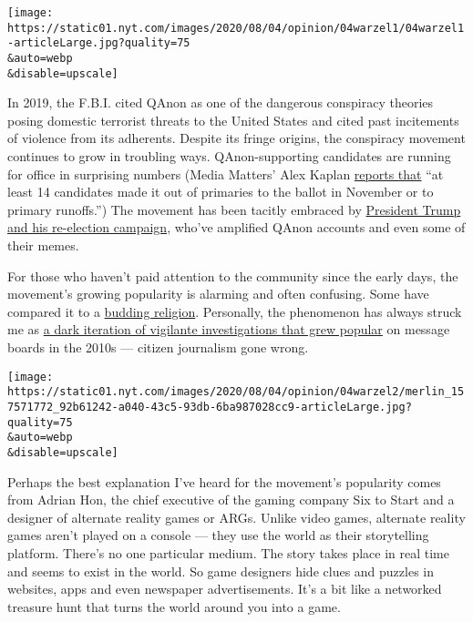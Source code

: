 \texttt{[image: https://static01.nyt.com/images/2020/08/04/opinion/04warzel1/04warzel1-articleLarge.jpg?quality=75\\\&auto=webp\\\&disable=upscale]}

In 2019, the F.B.I. cited QAnon as one of the dangerous conspiracy
theories posing domestic terrorist threats to the United States and
cited past incitements of violence from its adherents. Despite its
fringe origins, the conspiracy movement continues to grow in troubling
ways. QAnon-supporting candidates are running for office in surprising
numbers (Media Matters' Alex Kaplan
\href{https://www.mediamatters.org/qanon-conspiracy-theory/qanon-may-be-coming-congress-and-journalists-need-be-ready}{reports
that} ``at least 14 candidates made it out of primaries to the ballot in
November or to primary runoffs.'') The movement has been tacitly
embraced by
\href{https://www.washingtonpost.com/politics/how-the-trump-campaign-came-to-court-qanon-the-online-conspiracy-movement-identified-by-the-fbi-as-a-violent-threat/2020/08/01/dd0ea9b4-d1d4-11ea-9038-af089b63ac21_story.html?utm_campaign=wp_politics_am\&utm_medium=email\&utm_source=newsletter\&wpisrc=nl_politics}{President
Trump and his re-election campaign}, who've amplified QAnon accounts and
even some of their memes.

For those who haven't paid attention to the community since the early
days, the movement's growing popularity is alarming and often confusing.
Some have compared it to a
\href{https://www.theatlantic.com/magazine/archive/2020/06/qanon-nothing-can-stop-what-is-coming/610567/}{budding
religion}. Personally, the phenomenon has always struck me as
\href{https://www.buzzfeednews.com/article/charliewarzel/behind-the-alarming-rise-of-the-online-vigilante-detective}{a
dark iteration of vigilante investigations that grew popular} on message
boards in the 2010s --- citizen journalism gone wrong.

\texttt{[image: https://static01.nyt.com/images/2020/08/04/opinion/04warzel2/merlin\_157571772\_92b61242-a040-43c5-93db-6ba987028cc9-articleLarge.jpg?quality=75\\\&auto=webp\\\&disable=upscale]}

Perhaps the best explanation I've heard for the movement's popularity
comes from Adrian Hon, the chief executive of the gaming company Six to
Start and a designer of alternate reality games or ARGs. Unlike video
games, alternate reality games aren't played on a console --- they use
the world as their storytelling platform. There's no one particular
medium. The story takes place in real time and seems to exist in the
world. So game designers hide clues and puzzles in websites, apps and
even newspaper advertisements. It's a bit like a networked treasure hunt
that turns the world around you into a game.

